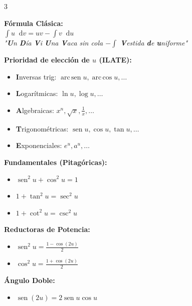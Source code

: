 \documentclass[9pt,landscape,a4paper]{article}
\newcommand{\dd}{\mathop{}\!\mathrm{d}}
\DeclareMathOperator{\sen}{sen}
\DeclareMathOperator{\arcsen}{arc\,sen}
\renewcommand{\arccos}{\operatorname{arc\,cos}}
\begin{document}
\begin{multicols}{3}
\columnbreak

\begin{tcolorbox}[colback=primary!3,colframe=primary,fonttitle=\bfseries,title=Integración por partes]
\textbf{Fórmula Clásica:} \\
$\int u \dd v = uv - \int v \dd u$ \\
\textit{{\footnotesize "\textbf{U}n \textbf{D}ía \textbf{V}i \textbf{U}na \textbf{V}aca sin cola $-\int$ \textbf{V}estida \textbf{d}e \textbf{u}niforme"}}

\vspace{0.2cm}
\textbf{Prioridad de elección de $u$ (ILATE):}
\begin{itemize}[leftmargin=*,itemsep=0pt]
\item \textbf{I}nversas trig: $\arcsen u, \arccos u, \dots$
\item \textbf{L}ogarítmicas: $\ln u, \log u, \dots$
\item \textbf{A}lgebraicas: $x^n, \sqrt{x}, \frac{1}{x}, \dots$
\item \textbf{T}rigonométricas: $\sen u, \cos u, \tan u, \dots$
\item \textbf{E}xponenciales: $e^u, a^u, \dots$
\end{itemize}
\end{tcolorbox}

\begin{tcolorbox}[colback=primary!3,colframe=primary,fonttitle=\bfseries,title=Identidades Trigonométricas]
\textbf{Fundamentales (Pitagóricas):}
\begin{itemize}[leftmargin=*,itemsep=0pt]
\item $\sen^2 u + \cos^2 u = 1$
\item $1 + \tan^2 u = \sec^2 u$
\item $1 + \cot^2 u = \csc^2 u$
\end{itemize}

\textbf{Reductoras de Potencia:}
\begin{itemize}[leftmargin=*,itemsep=0pt]
\item $\sen^2 u = \frac{1 - \cos(2u)}{2}$
\item $\cos^2 u = \frac{1 + \cos(2u)}{2}$
\end{itemize}

\textbf{Ángulo Doble:}
\begin{itemize}[leftmargin=*,itemsep=0pt]
\item $\sen(2u) = 2\sen u \cos u$
\end{itemize}
\end{tcolorbox}


\end{multicols}
\end{document}
